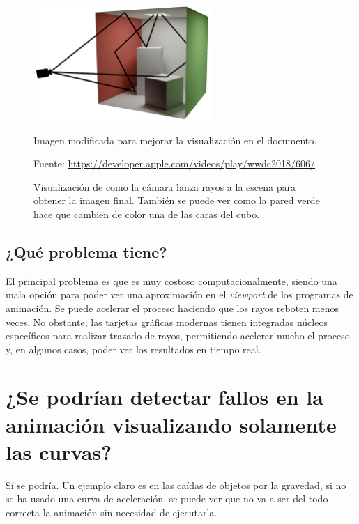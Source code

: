 \documentclass{article}
\begin{document}
\begin{figure}[H]
    \centering
    \includegraphics[width=0.6\textwidth]{imagenes/raytracingapple.png}
    \caption{Visualización de como la cámara lanza rayos a la escena para obtener la imagen final. También se puede ver como la pared verde hace que cambien de color una de las caras del cubo.}
   \vspace{10pt}
   \footnotesize{Imagen modificada para mejorar la visualización en el documento.}
   \vspace{10pt}

   \footnotesize{Fuente: \url{https://developer.apple.com/videos/play/wwdc2018/606/}}
 \end{figure}
\subsection{¿Qué problema tiene?}

El principal problema es que es muy costoso computacionalmente, siendo una mala opción para poder ver una aproximación en el \textit{viewport} de los programas de animación. Se puede acelerar el proceso haciendo que los rayos reboten menos veces. No obstante, las tarjetas gráficas modernas tienen integradas núcleos específicos para realizar trazado de rayos, permitiendo acelerar mucho el proceso y, en algunos casos, poder ver los resultados en tiempo real.


\section{¿Se podrían detectar fallos en la animación visualizando solamente las curvas?}

Sí se podría. Un ejemplo claro es en las caídas de objetos por la gravedad, si no se ha usado una curva de aceleración, se puede ver que no va a ser del todo correcta la animación sin necesidad de ejecutarla.
\end{document}
